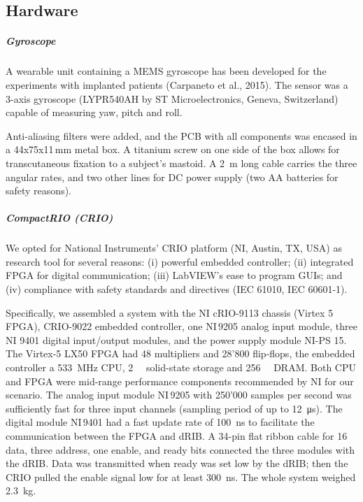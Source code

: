 \subsection{Hardware}
\subparagraph{Gyroscope}
A wearable unit containing a MEMS gyroscope has been developed for the experiments with implanted patients (Carpaneto et al., 2015). The sensor was a 3-axis gyroscope (LYPR540AH by ST Microelectronics, Geneva, Switzerland) capable of measuring yaw, pitch and roll. 

Anti-aliasing filters were added, and the PCB with all components was encased in a 44x75x11\,mm metal box. A titanium screw on one side of the box allows for transcutaneous fixation to a subject’s mastoid. A \SI{2}{\metre} long cable carries the three angular rates, and two other lines for DC power supply (two AA batteries for safety reasons).

\subparagraph{CompactRIO (CRIO)}
We opted for National Instruments’ CRIO platform (NI, Austin, TX, USA) as research tool for several reasons: (i) powerful embedded controller; (ii) integrated FPGA for digital communication; (iii) LabVIEW’s ease to program GUIs; and (iv) compliance with safety standards and directives (IEC 61010, IEC 60601-1).

	Specifically, we assembled a system with the NI cRIO-9113 chassis (Virtex 5 FPGA), CRIO-9022 embedded controller, one NI\,9205 analog input module, three NI 9401 digital input/output modules, and the power supply module NI-PS 15. The Virtex-5 LX50 FPGA had 48 multipliers and 28’800 flip-flops, the embedded controller a \SI{533}{\mega\hertz} CPU, \SI{2}{\giga\byte} solid-state storage and \SI{256}{\mega\byte} DRAM. Both CPU and FPGA were mid-range performance components recommended by NI for our scenario. The analog input module NI\,9205 with 250'000 samples per second was sufficiently fast for three input channels (sampling period of up to \SI{12}{\micro\second}). The digital module NI\,9401 had a fast update rate of \SI{100}{\nano\second} to facilitate the communication between the FPGA and dRIB. A 34-pin flat ribbon cable for 16 data, three address, one enable, and ready bits connected the three modules with the dRIB. Data was transmitted when ready was set low by the dRIB; then the CRIO pulled the enable signal low for at least \SI{300}{\nano\second}. The whole system weighed \SI{2.3}{\kilogram}.
	
